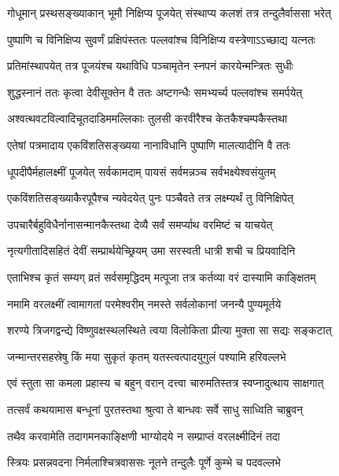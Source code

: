 \twolineshloka
{गोधूमान् प्रस्थसङ्ख्याकान् भूमौ निक्षिप्य पूजयेत्}
{संस्थाप्य कलशं तत्र तन्दुलैर्वाससा भरेत्} %

\twolineshloka
{पुष्पाणि च विनिक्षिप्य सुवर्णं प्रक्षिपंस्ततः}
{पल्लवांश्च विनिक्षिप्य वस्त्रेणाऽऽच्छाद्य यत्नतः} %

\twolineshloka
{प्रतिमांस्थापयेत् तत्र पूजयंश्च यथाविधि}
{पञ्चामृतेन स्नपनं कारयेन्मन्त्रितः सुधीः} %

\twolineshloka
{शुद्धस्नानं ततः कृत्वा देवीसूक्तेन वै ततः}
{अष्टगन्धैः समभ्यर्च्य पल्लवांश्च समर्पयेत्} %

\twolineshloka
{अश्वत्थवटविल्वादिचूतदाडिममल्लिकाः}
{तुलसी करवीरैश्च केतकैश्चम्पकैस्तथा} %

\twolineshloka
{एतेषां पत्रमादाय एकविंशतिसङ्ख्यया}
{नानाविधानि पुष्पाणि मालत्यादीनि वै ततः} %

\twolineshloka
{धूपदीपैर्महालक्ष्मीं पूजयेत् सर्वकामदाम्}
{पायसं सर्वमन्नञ्च सर्वभक्ष्येश्वसंयुतम्} %

\twolineshloka
{एकविंशतिसङ्ख्याकैरपूपैश्च न्यवेदयेत्}
{पुनः पञ्चैवते तत्र लक्ष्म्यर्थं तु विनिक्षिपेत्} %

\twolineshloka
{उपचारैर्बहुविधैर्नानासन्मानकैस्तथा}
{देव्यै सर्वं समर्प्याथ वरमिष्टं च याचयेत्} %

\twolineshloka
{नृत्यगीतादिसहितं देवीं सम्प्रार्थयेच्छ्रियम्}
{उमा सरस्वती धात्री शची च प्रियवादिनि} %

\twolineshloka
{एताभिश्च कृतं सम्यग् व्रतं सर्वसमृद्धिदम्}
{मत्पूजा तत्र कर्तव्या वरं दास्यामि काङ्क्षितम्} %


\twolineshloka
{नमामि वरलक्ष्मीं त्वामागतां परमेश्वरीम्}
{नमस्ते सर्वलोकानां जनन्यै पुण्यमूर्तये} %

\twolineshloka
{शरण्ये त्रिजगद्वन्द्ये विष्णुवक्षस्थलस्थिते}
{त्वया विलोकिता प्रीत्या मुक्ता सा सद्यः सङ्कटात्} %

\twolineshloka
{जन्मान्तरसहस्रेषु किं मया सुकृतं कृतम्}
{यतस्त्वत्पादयुगुलं पश्यामि हरिवल्लभे} %

\twolineshloka
{एवं स्तुता सा कमला प्रहास्य च बहुन् वरान्}
{दत्त्वा चारुमतिस्तत्र स्वप्नादुत्थाय साक्षगात्} %

\twolineshloka
{तत्सर्वं कथयामास बन्धूनां पुरतस्तथा}
{श्रुत्वा ते बान्धवः सर्वे साधु साध्विति चाब्रुवन्} %

\twolineshloka
{तथैव करवामेति तदागमनकाङ्क्षिणी}
{भाग्योदये न सम्प्राप्तं वरलक्ष्मीदिनं तदा} %

\twolineshloka
{स्त्रियः प्रसन्नवदना निर्मलाश्चित्रवाससः}
{नूतने तन्दुलैः पूर्णे कुम्भे च पदवल्लभे} %

